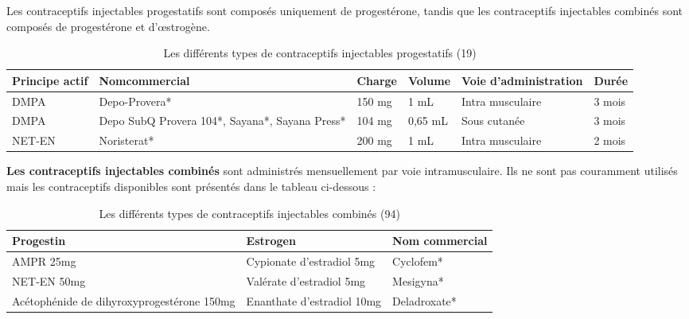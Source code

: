 Les contraceptifs injectables progestatifs sont composés uniquement de progestérone, tandis que les contraceptifs injectables combinés sont composés de progestérone et d’œstrogène. 


\begin{table}[H]
  \centering
  \renewcommand{\arraystretch}{1.5}
  \begin{spacing}{1.5} %
  \begin{tabularx}{\textwidth}{|X|p{3cm}|X|X|p{3.3cm}|X|}
      \hline
      \textbf{Principe actif} & \textbf{Nom\newline commercial} & \textbf{Charge}  & \textbf{Volume}  & \textbf{Voie d’administration} & \textbf{Durée}\\
      \hline
      DMPA & Depo-Provera*  & 150 mg & 1 mL & Intra musculaire & 3 mois\\
      \hline
      DMPA & Depo SubQ Provera 104*, Sayana*, Sayana Press*  & 104 mg & 0,65 mL & Sous cutanée  & 3 mois\\
      \hline
      NET-EN & Noristerat* & 200 mg  & 1 mL & Intra musculaire & 2 mois\\
      \hline
  \end{tabularx}
\end{spacing}
  \caption{Les différents types de contraceptifs injectables progestatifs (19)}
\end{table}

\textbf{Les contraceptifs injectables combinés} sont administrés mensuellement par voie intramusculaire. Ils ne sont pas couramment utilisés mais les contraceptifs disponibles sont présentés dans le tableau ci-dessous : 

\begin{table}[H]
  \centering
  \renewcommand{\arraystretch}{1.5}
  \begin{spacing}{1.5} %
  \begin{tabularx}{\textwidth}{|X|X|X|}
      \hline
      \textbf{Progestin } & \textbf{Estrogen} & \textbf{Nom commercial} \\
      \hline
      AMPR 25mg & Cypionate d’estradiol 5mg  & Cyclofem*\\
      \hline
      NET-EN 50mg  & Valérate d’estradiol 5mg  &  Mesigyna*\\
      \hline
      Acétophénide  \hspace{2cm} de dihyroxyprogestérone 150mg & Enanthate d’estradiol 10mg  & Deladroxate* \\
      \hline
  \end{tabularx}
\end{spacing}
  \caption{Les différents types de contraceptifs injectables combinés (94)}
\end{table}


